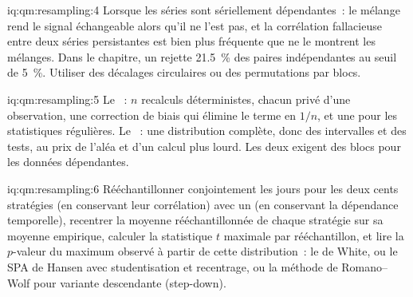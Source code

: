\begin{solution}{iq:qm:resampling:4}
Lorsque les séries sont sériellement dépendantes~: le mélange rend le signal échangeable alors qu'il ne l'est pas, et la corrélation fallacieuse entre deux
séries persistantes est bien plus fréquente que ne le montrent les mélanges. Dans le chapitre, un  rejette 21.5~\% des paires indépendantes au
seuil de 5~\%. Utiliser des décalages circulaires ou des permutations par blocs.
\end{solution}

\begin{solution}{iq:qm:resampling:5}
Le ~: $n$ recalculs déterministes, chacun privé d'une observation, une correction de biais qui élimine le terme en $1/n$, et une  pour les statistiques
régulières. Le ~: une distribution complète, donc des intervalles et des tests, au prix de l'aléa et d'un calcul plus lourd. Les deux exigent
des blocs pour les données dépendantes.
\end{solution}

\begin{solution}{iq:qm:resampling:6}
Rééchantillonner conjointement les jours pour les deux cents stratégies (en conservant leur corrélation) avec un  (en conservant la dépendance temporelle),
recentrer la moyenne rééchantillonnée de chaque stratégie sur sa moyenne empirique, calculer la statistique $t$ maximale par rééchantillon, et lire la $p$-valeur du
maximum observé à partir de cette distribution~: le  de White, ou le SPA de Hansen avec studentisation et recentrage, ou la méthode de Romano--Wolf pour
variante descendante (step-down).
\end{solution}
